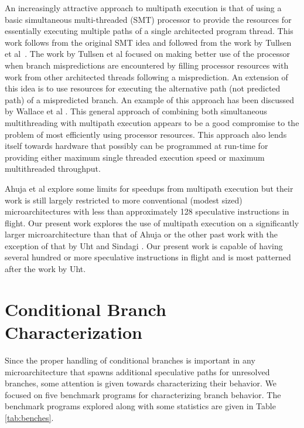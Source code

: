 \documentclass[10pt,dvips]{article}
\begin{document}
An increasingly attractive approach to multipath execution is that
of using a basic simultaneous multi-threaded (SMT) processor
to provide the resources for essentially executing multiple paths
of a single architected program thread.  This work follows from
the original SMT idea and followed from the work by
Tullsen et al~\cite{Tullsen96}.  
The work by Tullsen et al focused
on making better use of the processor when
branch mispredictions are encountered by filling processor resources with
work from other architected threads following a misprediction.
An extension of this idea is to use resources for executing
the alternative path (not predicted path) of a mispredicted branch.
An example of this approach has been discussed by 
Wallace et al \cite{Wallace98}.  This general approach of combining
both simultaneous multithreading with multipath execution appears
to be a good compromise to the problem of most efficiently using
processor resources.  This approach also lends itself towards
hardware that possibly can be programmed at run-time for providing either
maximum single threaded execution speed or maximum multithreaded throughput.

Ahuja et al \cite{Ahuja98} explore some limits for speedups from
multipath execution but their work is still largely restricted to more
conventional (modest sized) microarchitectures with less than approximately
128
speculative instructions in flight.  Our present work explores the use
of multipath execution on a significantly larger microarchitecture than
that of Ahuja or the other past work with the exception of that by
Uht and 
Sindagi \cite{Uht95}.
Our present work is capable of having several hundred or more
speculative instructions in flight and is most patterned after the
work by Uht.
%
\section{Conditional Branch Characterization}
%
Since the proper handling of conditional branches is important
in any microarchitecture that spawns additional speculative
paths for unresolved branches, some attention is given
towards characterizing their behavior.  
We focused
on five benchmark programs for characterizing branch behavior.
The benchmark programs explored along with some statistics 
are given in Table \ref{tab:benches}.
\end{document}
